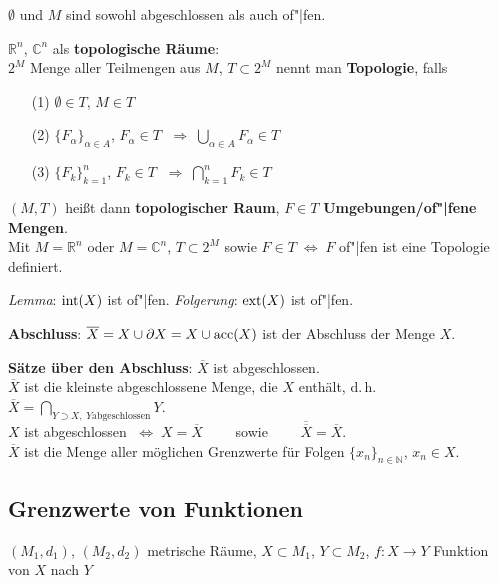 $\emptyset$ und $M$ sind sowohl abgeschlossen als auch of"|fen.

\linie

$\mathbb{R}^n$, $\mathbb{C}^n$ als \textbf{topologische Räume}: \\
$2^M$ Menge aller Teilmengen aus $M$, $T \subset 2^M$ nennt man
\textbf{Topologie}, falls

\begin{itemize}
    \item[(1)] $\emptyset \in T$, $M \in T$
    
    \item[(2)] $\{F_\alpha\}_{\alpha \in A}$, $F_\alpha \in T$
    $\;\Rightarrow\; \bigcup_{\alpha \in A} F_\alpha \in T$
    
    \item[(3)] $\{F_k\}_{k=1}^n$, $F_k \in T$
    $\;\Rightarrow\; \bigcap_{k=1}^n F_k \in T$
\end{itemize}

$(M,T)$ heißt dann \textbf{topologischer Raum}, $F \in T$
\textbf{Umgebungen/of"|fene Mengen}. \\
Mit $M = \mathbb{R}^n$ oder $M = \mathbb{C}^n$, $T \subset 2^M$ sowie
$F \in T \;\Leftrightarrow\; F$ of"|fen ist eine Topologie definiert.

\emph{Lemma}: $\operatorname{int}(X)$ ist of"|fen. \qquad
\emph{Folgerung}: $\operatorname{ext}(X)$ ist of"|fen.

\linie

\textbf{Abschluss}: $\overline{X} = X \cup \partial X = X \cup \operatorname{acc}(X)$ ist
der Abschluss der Menge $X$.

\textbf{Sätze über den Abschluss}:
$\overline{X}$ ist abgeschlossen. \\
$\overline{X}$ ist die kleinste abgeschlossene Menge, die $X$
enthält, d.\,h.
$\overline{X} = \bigcap_{Y \supset X,\; Y \text{abgeschlossen}} Y$. \\
$X$ ist abgeschlossen $\;\Leftrightarrow\; X = \overline{X} \qquad$ sowie
$\qquad \overline{\overline{X}} = \overline{X}$. \\
$\overline{X}$ ist die Menge aller möglichen Grenzwerte für Folgen
$\{x_n\}_{n \in \mathbb{N}}$, $x_n \in X$.

\subsection{%
    Grenzwerte von Funktionen%
}

$(M_1,d_1)$, $(M_2,d_2)$ metrische Räume, $X \subset M_1$, $Y \subset M_2$,
$f: X \rightarrow Y$ Funktion von $X$ nach $Y$

